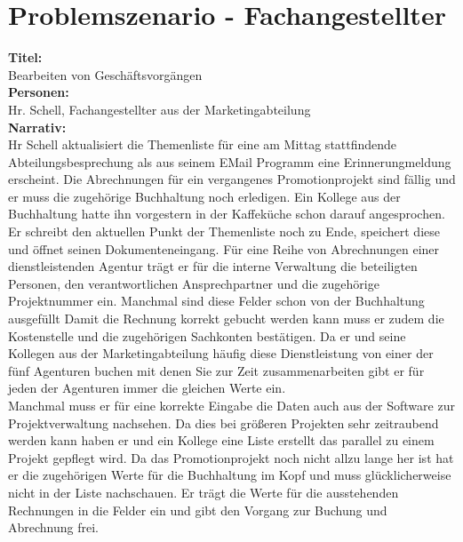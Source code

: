 \documentclass[11pt,oneside,a4paper,notitlepage]{article}
\begin{document}
%
\section{Problemszenario - Fachangestellter}


\textbf{Titel: }\\
Bearbeiten von Geschäftsvorgängen\\
\textbf{Personen: }\\
Hr. Schell, Fachangestellter aus der Marketingabteilung\\[1cm]
\noindent
\textbf{Narrativ: }\\
Hr Schell aktualisiert die Themenliste für eine am Mittag stattfindende Abteilungsbesprechung als aus seinem EMail Programm eine
Erinnerungmeldung erscheint. Die Abrechnungen für ein vergangenes Promotionprojekt sind fällig und er muss die zugehörige Buchhaltung noch erledigen. Ein Kollege aus der Buchhaltung hatte ihn vorgestern in der Kaffeküche schon darauf angesprochen. Er schreibt den aktuellen Punkt der Themenliste noch zu Ende, speichert diese und öffnet seinen Dokumenteneingang. Für eine Reihe von Abrechnungen einer dienstleistenden Agentur trägt er für die interne Verwaltung die beteiligten Personen, den verantwortlichen Ansprechpartner und die zugehörige Projektnummer ein. Manchmal sind diese Felder schon von der Buchhaltung ausgefüllt Damit die Rechnung korrekt gebucht werden kann muss er zudem die Kostenstelle und die zugehörigen Sachkonten bestätigen. Da er und seine Kollegen aus der Marketingabteilung häufig diese Dienstleistung von einer der fünf Agenturen buchen mit denen Sie zur Zeit zusammenarbeiten gibt er für jeden der Agenturen immer die gleichen Werte ein.\\
Manchmal muss er für eine korrekte Eingabe die Daten auch aus der Software zur Projektverwaltung nachsehen. Da dies bei größeren Projekten sehr zeitraubend werden kann haben er und ein Kollege eine Liste erstellt das parallel zu einem Projekt gepflegt wird.
Da das Promotionprojekt noch nicht allzu lange her ist hat er die zugehörigen Werte für die Buchhaltung im Kopf und muss  glücklicherweise nicht in der Liste nachschauen. Er trägt die Werte für die ausstehenden Rechnungen in die Felder ein und gibt den Vorgang zur Buchung und Abrechnung frei.


%
\end{document}
